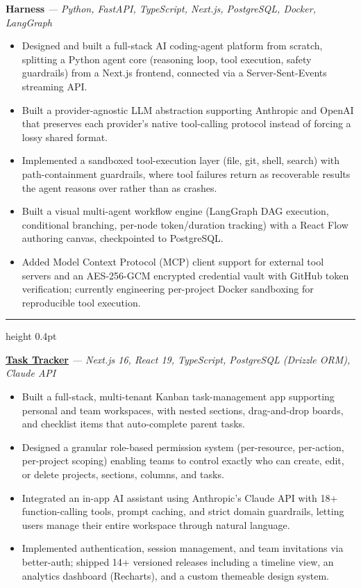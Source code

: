 \documentclass[a4paper,10.5pt]{article}
\newcommand{\projectdivider}{\vspace{6pt}\textcolor{dividercolor}{\hrule height 0.4pt}\vspace{6pt}}
\newcommand{\projecttitle}[2]{\noindent\textbf{#1} \textit{#2}\par\vspace{2pt}}
\begin{document}
\projecttitle{Harness}{--- Python, FastAPI, TypeScript, Next.js, PostgreSQL, Docker, LangGraph}
\begin{itemize}
\item Designed and built a full-stack AI coding-agent platform from scratch, splitting a Python agent core (reasoning loop, tool execution, safety guardrails) from a Next.js frontend, connected via a Server-Sent-Events streaming API.
\item Built a provider-agnostic LLM abstraction supporting Anthropic and OpenAI that preserves each provider's native tool-calling protocol instead of forcing a lossy shared format.
\item Implemented a sandboxed tool-execution layer (file, git, shell, search) with path-containment guardrails, where tool failures return as recoverable results the agent reasons over rather than as crashes.
\item Built a visual multi-agent workflow engine (LangGraph DAG execution, conditional branching, per-node token/duration tracking) with a React Flow authoring canvas, checkpointed to PostgreSQL.
\item Added Model Context Protocol (MCP) client support for external tool servers and an AES-256-GCM encrypted credential vault with GitHub token verification; currently engineering per-project Docker sandboxing for reproducible tool execution.
\end{itemize}

\projectdivider

\projecttitle{\href{https://task-tracker-gray-mu.vercel.app/}{Task Tracker}}{--- Next.js 16, React 19, TypeScript, PostgreSQL (Drizzle ORM), Claude API}
\begin{itemize}
\item Built a full-stack, multi-tenant Kanban task-management app supporting personal and team workspaces, with nested sections, drag-and-drop boards, and checklist items that auto-complete parent tasks.
\item Designed a granular role-based permission system (per-resource, per-action, per-project scoping) enabling teams to control exactly who can create, edit, or delete projects, sections, columns, and tasks.
\item Integrated an in-app AI assistant using Anthropic's Claude API with 18+ function-calling tools, prompt caching, and strict domain guardrails, letting users manage their entire workspace through natural language.
\item Implemented authentication, session management, and team invitations via better-auth; shipped 14+ versioned releases including a timeline view, an analytics dashboard (Recharts), and a custom themeable design system.
\end{itemize}
\end{document}
